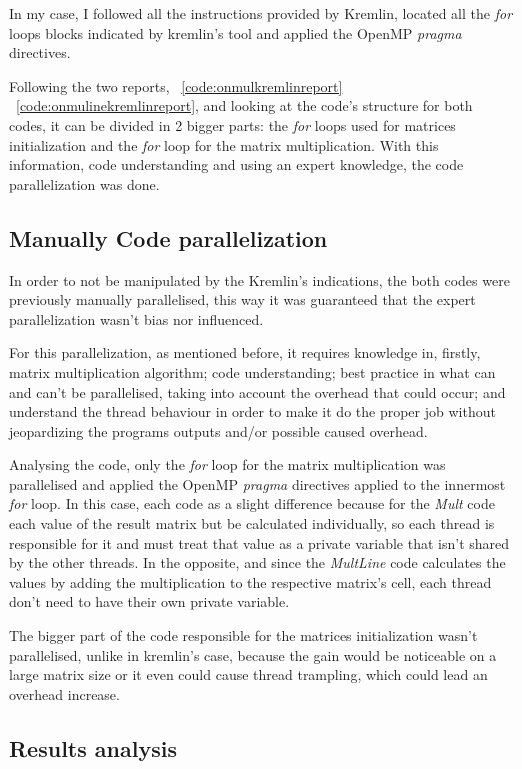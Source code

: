 In my case, I followed all the instructions provided by Kremlin, located all the \textit{for} loops blocks indicated by kremlin's tool and applied the OpenMP \textit{pragma} directives. 

Following the two reports, ~\ref{code:onmulkremlinreport} ~\ref{code:onmulinekremlinreport}, and looking at the code's structure for both codes, it can be divided in 2 bigger parts: the \textit{for} loops used for matrices initialization and the \textit{for} loop for the matrix multiplication. With this information, code understanding and using an expert knowledge, the code parallelization was done.


\subsection{Manually Code parallelization}

In order to not be manipulated by the Kremlin's indications, the both codes were previously manually parallelised, this way it was guaranteed that the expert parallelization wasn't bias nor influenced.

For this parallelization, as mentioned before, it requires knowledge in, firstly, matrix multiplication algorithm; code understanding; best practice in what can and can't be parallelised, taking into account the overhead that could occur; and understand the thread behaviour in order to make it do the proper job without jeopardizing the programs outputs and/or possible caused overhead.  

Analysing the code, only the \textit{for} loop for the matrix multiplication was parallelised and applied the OpenMP \textit{pragma} directives applied to the innermost \textit{for} loop. In this case, each code as a slight difference because for the \textit{Mult} code each value of the result matrix but be calculated individually, so each thread is responsible for it and must treat that value as a private variable that isn't shared by the other threads. In the opposite, and since the \textit{MultLine} code calculates the values by adding the multiplication to the respective matrix's cell, each thread don't need to have their own private variable.

The bigger part of the code responsible for the matrices initialization wasn't parallelised, unlike in kremlin's case, because the gain would be noticeable on a large matrix size or it even could cause thread trampling, which could lead an overhead increase. 


\subsection{Results analysis}

